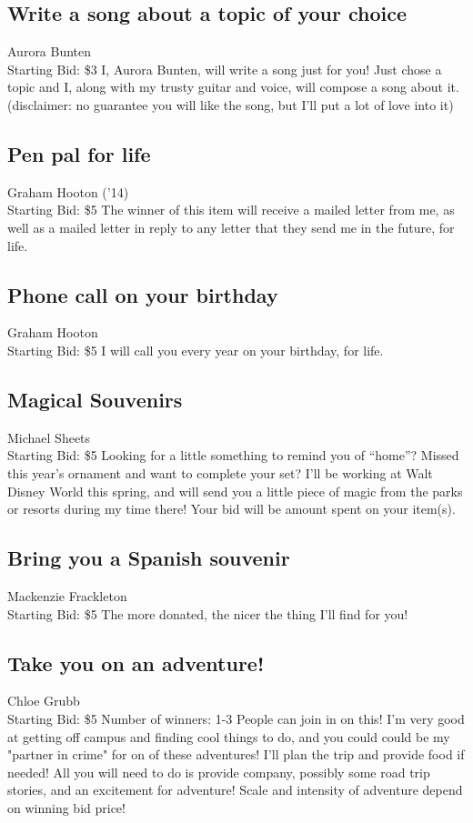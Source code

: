 \documentclass[11pt]{article}
\begin{document}
\subsection{Write a song about a topic of your choice}
Aurora Bunten
\\
Starting Bid: \$3
\newline
I, Aurora Bunten, will write a song just for you! Just chose a topic and I, along with my trusty guitar and voice, will compose a song about it. (disclaimer: no guarantee you will like the song, but I'll put a lot of love into it)
\subsection{Pen pal for life}
Graham Hooton ('14)
\\
Starting Bid: \$5
\newline
The winner of this item will receive a mailed letter from me, as well as a mailed letter in reply to any letter that they send me in the future, for life.
\subsection{Phone call on your birthday}
Graham Hooton
\\
Starting Bid: \$5
\newline
I will call you every year on your birthday, for life.
\subsection{Magical Souvenirs}
Michael Sheets
\\
Starting Bid: \$5
\newline
Looking for a little something to remind you of “home”? Missed this year’s ornament and want to complete your set? I’ll be working at Walt Disney World this spring, and will send you a little piece of magic from the parks or resorts during my time there! Your bid will be amount spent on your item(s).
\subsection{Bring you a Spanish souvenir }
Mackenzie Frackleton
\\
Starting Bid: \$5
\newline
The more donated, the nicer the thing I'll find for you!
\subsection{Take you on an adventure!}
Chloe Grubb
\\
Starting Bid: \$5
\newline
Number of winners: 1-3 People can join in on this!
\newline
I'm very good at getting off campus and finding cool things to do, and you could could be my "partner in crime" for on of these adventures! I'll plan the trip and provide food if needed! All you will need to do is provide company, possibly some road trip stories, and an excitement for adventure! Scale and intensity of adventure depend on winning bid price!
\end{document}
